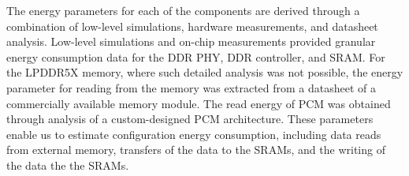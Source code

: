 
The energy parameters for each of the components are derived through a combination of low-level simulations, hardware measurements, and datasheet analysis.
Low-level simulations and on-chip measurements provided granular energy consumption data for the DDR PHY, DDR controller, \confignoc{} and SRAM.
For the LPDDR5X memory, where such detailed analysis was not possible, the energy parameter for reading from the memory was extracted from a datasheet of a commercially available memory module.
The read energy of PCM was obtained through analysis of a custom-designed PCM architecture.
These parameters enable us to estimate configuration energy consumption, including data reads from external memory, transfers of the data to the SRAMs, and the writing of the data the the SRAMs.

